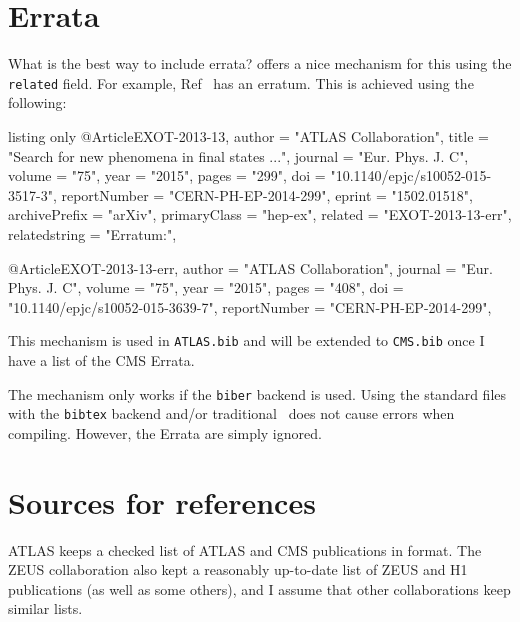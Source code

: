 \section{Errata}%
\label{sec:ref:errata}

What is the best way to include errata?
 offers a nice mechanism for this using the \texttt{related} field.
For example, Ref~\cite{EXOT-2013-13} has an erratum.
This is achieved using the following:
\begin{tcblisting}{listing only}
@Article{EXOT-2013-13,
    author         = "{ATLAS Collaboration}",
    title          = "{Search for new phenomena in final states ...}",
    journal        = "Eur. Phys. J. C",
    volume         = "75",
    year           = "2015",
    pages          = "299",
    doi            = "10.1140/epjc/s10052-015-3517-3",
    reportNumber   = "CERN-PH-EP-2014-299",
    eprint         = "1502.01518",
    archivePrefix  = "arXiv",
    primaryClass   = "hep-ex",
    related        = "EXOT-2013-13-err",
    relatedstring  = "Erratum:",
}

@Article{EXOT-2013-13-err,
    author         = "{ATLAS Collaboration}",
    journal        = "Eur. Phys. J. C",
    volume         = "75",
    year           = "2015",
    pages          = "408",
    doi            = "10.1140/epjc/s10052-015-3639-7",
    reportNumber   = "CERN-PH-EP-2014-299",
}
\end{tcblisting}

This mechanism is used in \texttt{ATLAS.bib} and will be extended to \texttt{CMS.bib} once
I have a list of the CMS Errata.

The mechanism only works if the \texttt{biber} backend is used.
Using the standard files with the \texttt{bibtex} backend and/or traditional \BibTeX\ does not cause errors when compiling.
However, the Errata are simply ignored.


\section{Sources for references}%
\label{sec:ref:sources}

ATLAS keeps a checked list of ATLAS and CMS publications in \BibTeX{} format. 
The ZEUS collaboration also kept a reasonably up-to-date list of ZEUS and
H1 publications (as well as some others),
and I assume that other collaborations keep similar lists.

